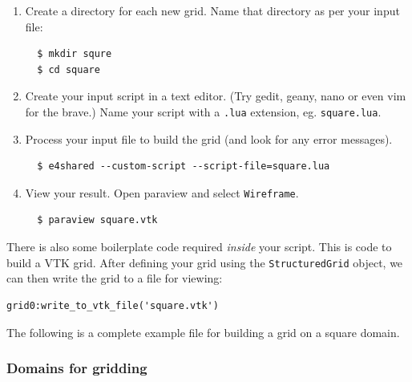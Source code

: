 \documentclass{article}
\begin{document}
\begin{enumerate}
\item Create a directory for each new grid. Name that directory as per your
  input file:
\begin{verbatim}
  $ mkdir squre
  $ cd square
\end{verbatim}

\item Create your input script in a text editor.
  (Try gedit, geany, nano or even vim for the brave.)
  Name your script with a \texttt{.lua} extension, eg. \texttt{square.lua}.

\item Process your input file to build the grid
  (and look for any error messages).
\begin{verbatim}
  $ e4shared --custom-script --script-file=square.lua
\end{verbatim}

\item View your result. Open paraview and select \texttt{Wireframe}.
\begin{verbatim}
  $ paraview square.vtk
\end{verbatim}

\end{enumerate}

There is also some boilerplate code required \emph{inside}
your script.
This is code to build a VTK grid.
After defining your grid using the \texttt{StructuredGrid}
object, we can then write the grid to a file for viewing:
\begin{verbatim}
grid0:write_to_vtk_file('square.vtk')
\end{verbatim}

The following is a complete example file for building a grid on a square domain.


\subsubsection*{Domains for gridding}
\end{document}
